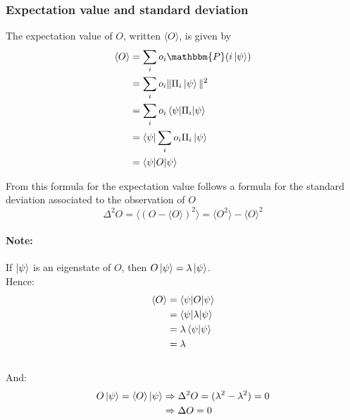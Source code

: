 \documentclass{article}
\begin{document}
\subsubsection*{Expectation value and standard deviation}

The expectation value of $O$, written $\langle O\rangle$, is given by
\begin{equation}
    \begin{aligned}
        \langle O\rangle
            & = \sum_i o_i \mathbbm{P}(i\ket{\psi}) \\
            & = \sum_i o_i \|\Pi_i\ket{\psi}\|^2 \\
            & = \sum_i o_i \braket{\psi|\Pi_i|\psi} \\
            & = \bra{\psi}\sum_i o_i \Pi_i \ket{\psi} \\
            & = \braket{\psi | O |\psi}
    \end{aligned}
\end{equation}

From this formula for the expectation value follows a formula for the standard
deviation associated to the observation of $O$
\begin{equation}
    \Delta^2 O = \langle(O - \langle O \rangle)^2\rangle = \langle O^2 \rangle - \langle O \rangle^2
\end{equation}

\paragraph{Note:} If $\ket{\psi}$ is an eigenstate of $O$, then $O\ket{\psi} =
\lambda \ket{\psi}$. \\
Hence:
\begin{equation}
    \begin{aligned}
        \braket{O}
            & = \braket{\psi | O | \psi} \\
            & = \braket{\psi | \lambda | \psi} \\
            & = \lambda\braket{\psi|\psi } \\
            & = \lambda
    \end{aligned}
\end{equation}
\\
And:
\begin{equation}
    \begin{aligned}
        O\ket{\psi} = \braket{O} \ket{\psi}
            & \Rightarrow \Delta^2 O = (\lambda^2 - \lambda^2) = 0 \\
            & \Rightarrow \Delta O = 0
    \end{aligned}
\end{equation}
\end{document}

